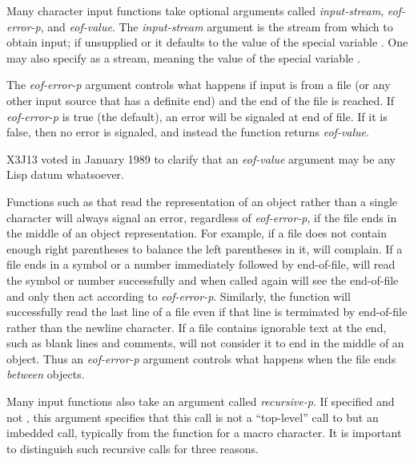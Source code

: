 Many character
input functions take optional arguments called \emph{input-stream},
\emph{eof-error-p}, and \emph{eof-value}.  The \emph{input-stream} argument is the
stream from
which to obtain input; if unsupplied or {\false} it defaults to the value of
the special variable .  One may also specify {\true}
as a stream, meaning the value of the special variable
.

The \emph{eof-error-p} argument
controls what happens if input is from a file (or any other
input source that has a definite end) and the end of the file is reached.
If \emph{eof-error-p} is true (the default), an error will be signaled
at end of file.  If it is false, then no error is signaled, and instead
the function returns \emph{eof-value}.
\begin{new}
X3J13 voted in January 1989
to clarify that an \emph{eof-value} argument
may be any Lisp datum whatsoever.
\end{new}


Functions such as  that read the representation
of an object rather than a single
character will always signal an error, regardless of \emph{eof-error-p}, if
the file ends in the middle of an object representation.
For example, if a file does
not contain enough right parentheses to balance the left parentheses in
it,  will complain.  If a file ends in a symbol or a number
immediately followed by end-of-file,  will read the symbol or
number successfully and when called again will see the end-of-file and
only then act according to \emph{eof-error-p}.
Similarly, the function 
will successfully read the last line of a file even if that line
is terminated by end-of-file rather than the newline character.
If a file contains ignorable text at the end, such
as blank lines and comments,  will not consider it to end in the
middle of an object.
Thus an \emph{eof-error-p} argument controls what happens
when the file ends \emph{between} objects.

Many input functions also take an argument called \emph{recursive-p}.
If specified and not {\nil}, this argument specifies that
this call is not a ``top-level'' call to  but an imbedded call,
typically from the function for a macro character.
It is important to distinguish such recursive calls for three reasons.

